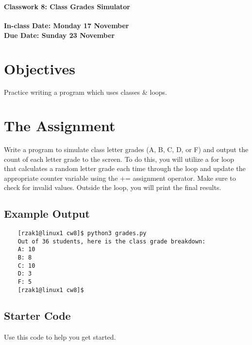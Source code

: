 \documentclass[letter,10pt]{article}
\begin{document}
    
    \huge
    \textbf{Classwork 8: Class Grades Simulator}
    \normalsize
    \\ ~~ \\
    \textbf{In-class Date: Monday 17 November} \\
    \textbf{Due Date: Sunday 23 November}
    
    \section*{Objectives}
    \paragraph{}Practice writing a program which uses classes \& loops.
    
    \section*{The Assignment}
    \paragraph{}Write a program to simulate class letter grades (A, B, C, D, or F) and output the count of each letter grade to the screen. To do this, you will utilize a for loop that calculates a random letter grade each time through the loop and update the appropriate counter variable using the += assignment operator. Make sure to check for invalid values. Outside the loop, you will print the final results.
    
    \subsection*{Example Output}
    \begin{verbatim}
    [rzak1@linux1 cw8]$ python3 grades.py
    Out of 36 students, here is the class grade breakdown:
    A: 10
    B: 8
    C: 10
    D: 3
    F: 5
    [rzak1@linux1 cw8]$ 
    \end{verbatim}
    
    \subsection*{Starter Code}
    \paragraph{}Use this code to help you get started.
    
\end{document}
